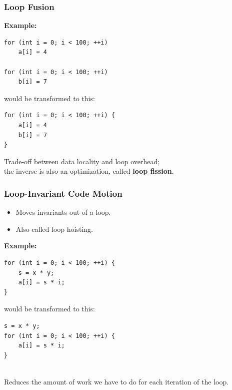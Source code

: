 \documentclass[aspectratio=43]{beamer}
\newenvironment{changemargin}[1]{%
  \begin{list}{}{%
    \setlength{\topsep}{0pt}%
    \setlength{\leftmargin}{#1}%
    \setlength{\rightmargin}{1em}
    \setlength{\listparindent}{\parindent}%
    \setlength{\itemindent}{\parindent}%
    \setlength{\parsep}{\parskip}%
  }%
  \item[]}{\end{list}}
\begin{document}
\begin{frame}[fragile]
  \frametitle{Loop Fusion}

  \begin{changemargin}{2cm}
  {\bf Example:}
  \begin{lstlisting}
for (int i = 0; i < 100; ++i)
    a[i] = 4

for (int i = 0; i < 100; ++i)
    b[i] = 7
  \end{lstlisting}
  would be transformed to this:
  \begin{lstlisting}
for (int i = 0; i < 100; ++i) {
    a[i] = 4
    b[i] = 7
}
  \end{lstlisting}
  \vfill
  Trade-off  between data locality and loop overhead; \\ 
  the inverse is also an optimization, called {\bf loop fission}.
  \end{changemargin}
\end{frame}

\begin{frame}[fragile]
  \frametitle{Loop-Invariant Code Motion}
  
  \begin{changemargin}{2cm}
  \begin{itemize}
    \item Moves invariants out of a loop.
    \item Also called loop hoisting.
  \end{itemize}

  {\bf Example:}
  \begin{lstlisting}
for (int i = 0; i < 100; ++i) {
    s = x * y;
    a[i] = s * i;
}
  \end{lstlisting}
  would be transformed to this:
  \begin{lstlisting}
s = x * y;
for (int i = 0; i < 100; ++i) {
    a[i] = s * i;
}
  \end{lstlisting}
~\\
  Reduces the amount of work we have to do for each iteration of the loop.
  \end{changemargin}
\end{frame}
\end{document}
